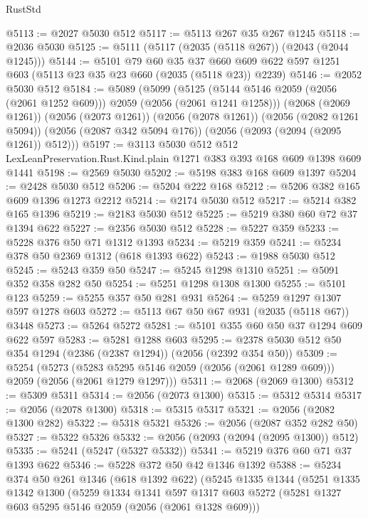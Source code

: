 \begin{lexlean}{RustStd}
\begin{coremodule}
@5113 := @2027 @5030 @512
@5117 := @5113 @267 @35 @267 @1245
@5118 := @2036 @5030
@5125 := @5111 (@5117 (@2035 (@5118 @267)) (@2043 (@2044 @1245)))
@5144 := @5101
    @79
    @60
    @35
    @37
    @660
    @609
    @622
    @597
    @1251
    @603
    (@5113 @23 @35 @23 @660 (@2035 (@5118 @23)) @2239)
@5146 := @2052 @5030 @512
@5184 := @5089
    (@5099
      (@5125 (@5144 @5146 @2059 (@2056 (@2061 @1252 @609))) @2059 (@2056 (@2061 @1241 @1258)))
      (@2068 (@2069 @1261))
      (@2056 (@2073 @1261))
      (@2056 (@2078 @1261))
      (@2056 (@2082 @1261 @5094))
      (@2056 (@2087 @342 @5094 @176))
      (@2056 (@2093 (@2094 (@2095 @1261)) @512)))
@5197 := @3113
    @5030
    @512
    @512
    LexLeanPreservation.Rust.Kind.plain
    @1271
    @383
    @393
    @168
    @609
    @1398
    @609
    @1441
@5198 := @2569 @5030
@5202 := @5198 @383 @168 @609 @1397
@5204 := @2428 @5030 @512
@5206 := @5204 @222 @168
@5212 := @5206 @382 @165 @609 @1396 @1273 @2212
@5214 := @2174 @5030 @512
@5217 := @5214 @382 @165 @1396
@5219 := @2183 @5030 @512
@5225 := @5219 @380 @60 @72 @37 @1394 @622
@5227 := @2356 @5030 @512
@5228 := @5227 @359
@5233 := @5228 @376 @50 @71 @1312 @1393
@5234 := @5219 @359
@5241 := @5234 @378 @50 @2369 @1312 (@618 @1393 @622)
@5243 := @1988 @5030 @512
@5245 := @5243 @359 @50
@5247 := @5245 @1298 @1310
@5251 := @5091 @352 @358 @282 @50
@5254 := @5251 @1298 @1308 @1300
@5255 := @5101 @123
@5259 := @5255 @357 @50 @281 @931
@5264 := @5259 @1297 @1307 @597 @1278 @603
@5272 := @5113 @67 @50 @67 @931 (@2035 (@5118 @67)) @3448
@5273 := @5264 @5272
@5281 := @5101 @355 @60 @50 @37 @1294 @609 @622 @597
@5283 := @5281 @1288 @603
@5295 := @2378 @5030 @512 @50 @354 @1294 (@2386 (@2387 @1294)) (@2056 (@2392 @354 @50))
@5309 := @5254
    (@5273 (@5283 @5295 @5146 @2059 (@2056 (@2061 @1289 @609))) @2059 (@2056 (@2061 @1279 @1297)))
@5311 := @2068 (@2069 @1300)
@5312 := @5309 @5311
@5314 := @2056 (@2073 @1300)
@5315 := @5312 @5314
@5317 := @2056 (@2078 @1300)
@5318 := @5315 @5317
@5321 := @2056 (@2082 @1300 @282)
@5322 := @5318 @5321
@5326 := @2056 (@2087 @352 @282 @50)
@5327 := @5322 @5326
@5332 := @2056 (@2093 (@2094 (@2095 @1300)) @512)
@5335 := @5241 (@5247 (@5327 @5332))
@5341 := @5219 @376 @60 @71 @37 @1393 @622
@5346 := @5228 @372 @50 @42 @1346 @1392
@5388 := @5234
    @374
    @50
    @261
    @1346
    (@618 @1392 @622)
    (@5245
      @1335
      @1344
      (@5251
        @1335
        @1342
        @1300
        (@5259
          @1334
          @1341
          @597
          @1317
          @603
          @5272
          (@5281 @1327 @603 @5295 @5146 @2059 (@2056 (@2061 @1328 @609)))

\end{coremodule}
\end{lexlean}
